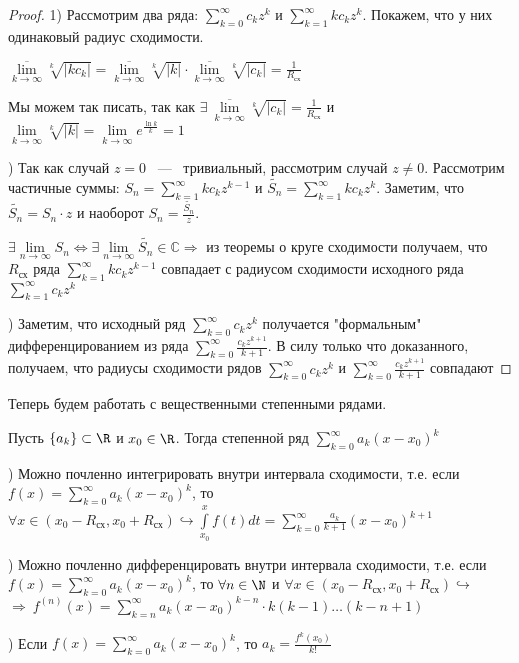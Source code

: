 \begin{proof}
    1) Рассмотрим два ряда: $\sum\limits_{k = 0}^{\infty} c_kz^{k}$ и $\sum\limits_{k = 1}^{\infty} kc_kz^{k}$. Покажем, что у них одинаковый радиус сходимости. 

    \noindent $\overline{\lim\limits_{k \rightarrow \infty}} \sqrt[k]{|kc_k|} = \overline{\lim\limits_{k \rightarrow \infty}} \sqrt[k]{|k|} \cdot \overline{\lim\limits_{k \rightarrow \infty}} \sqrt[k]{|c_k|} = \frac{1}{R_{\text{сх}}}$

    \noindent Мы можем так писать, так как $\exists \ \overline{\lim\limits_{k \rightarrow \infty}} \sqrt[k]{|c_k|} = \frac{1}{R_{\text{сх}}}$ и $\lim\limits_{k \rightarrow \infty} \sqrt[k]{|k|} = \lim\limits_{k \rightarrow \infty} e^{\frac{\ln k}{k}} = 1$

    ) Так как случай $z = 0$ ~---~ тривиальный, рассмотрим случай $z \neq 0$. Рассмотрим частичные суммы: $S_n = \sum\limits_{k = 1}^\infty kc_kz^{k - 1}$ и $\widetilde{S_n} = \sum\limits_{k = 1}^\infty kc_kz^{k}$. Заметим, что $\widetilde{S_n} = S_n \cdot z$ и наоборот $S_n = \frac{\widetilde{S_n}}{z}$.

    \noindent $\exists \lim\limits_{n\rightarrow \infty }S_n \Leftrightarrow \exists \lim\limits_{n \rightarrow \infty }\widetilde{S_n} \in \mathbb{C} \Rightarrow$ из теоремы о круге сходимости получаем, что $R_{\text{сх}}$ ряда $\sum\limits_{k = 1}^\infty kc_kz^{k - 1}$ совпадает с радиусом сходимости исходного ряда $\sum\limits_{k = 1}^\infty c_kz^{k}$

    ) Заметим, что исходный ряд $\sum\limits_{k = 0}^\infty c_kz^{k}$ получается 
    "формальным"  дифференцированием из ряда $\sum\limits_{k = 0}^\infty \frac{c_kz^{k + 1}}{k + 1}$. В силу только что доказанного, получаем, что радиусы сходимости рядов $\sum\limits_{k = 0}^\infty c_kz^{k}$ и $\sum\limits_{k = 0} ^\infty \frac{c_k z^{k + 1}}{k + 1}$ совпадают
\end{proof}

Теперь будем работать с вещественными степенными рядами. 

\begin{theorem} 
    Пусть $\{a_k\} \subset \R $ и $x_0 \in \R$. Тогда степенной ряд $\sum\limits_{k = 0}^\infty a_k (x - x_0)^k$
    
    ) Можно почленно интегрировать внутри интервала сходимости, т.е. если $f(x) = \sum\limits_{k = 0}^\infty a_k (x - x_0)^k$, то $\forall  x \in (x_0 - R_{\text{сх}}, x_0 + R_{\text{сх}}) \hookrightarrow \int\limits_{x_0}^{x} f(t) dt = \sum\limits_{k = 0}^\infty \frac{a_k}{k + 1} (x - x_0)^{k + 1}$

    ) Можно почленно дифференцировать внутри интервала сходимости, т.е. если $f(x) = \sum\limits_{k = 0}^\infty a_k(x - x_0)^k$, то $\forall n \in \N$ и $\forall  x \in (x_0 - R_{\text{сх}}, x_0 + R_{\text{сх}}) \hookrightarrow $ $\Rightarrow \ f^{(n)}(x) = \sum\limits_{k = n}^\infty a_k(x - x_0)^{k - n}\cdot k(k - 1)\dots (k - n + 1)$

    ) Если $f(x) = \sum\limits_{k = 0}^\infty a_k (x - x_0)^k$, то $a_k = \frac{f^{k}(x_0)}{k!}$
\end{theorem}

